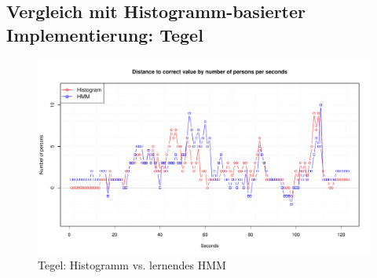 \subsection{Vergleich mit Histogramm-basierter Implementierung: Tegel}
\label{sec:eval:tegel}
\begin{figure}
	\centering
\includegraphics[width=1\textwidth]{bilder/safest_plot_tegel_7-55_hmm_learn.pdf}
	\caption{Tegel: Histogramm vs. lernendes HMM}
	\label{fig:tegel_7-55_learn}
\end{figure}

